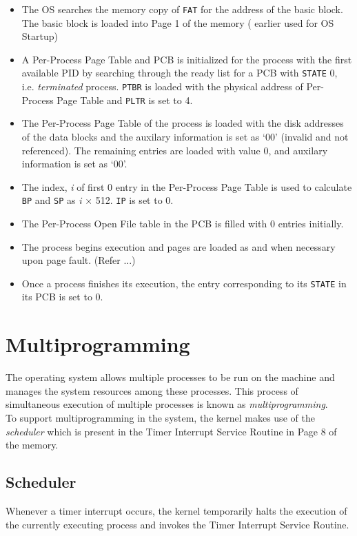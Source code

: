 \documentclass[10pt]{report}
\begin{document}
\begin{itemize}
	\item The OS searches the memory copy of \texttt{FAT} for the address of the basic block. The basic block is loaded into Page 1 of the memory ( earlier used for OS Startup)
	\item A Per-Process Page Table and  PCB is initialized for the process with the first available PID by searching through the ready list for a PCB with \texttt{STATE} 0, i.e. \textit{terminated} process. \texttt{PTBR} is loaded with the physical address of Per-Process Page Table and \texttt{PLTR} is set to 4.
	\item The Per-Process Page Table of the process is loaded with the disk addresses of the data blocks and the auxilary information is set as `00'  (invalid and not referenced). The remaining entries are loaded with value 0, and auxilary information is set as `00'. 
	\item The index, \textit{i} of first 0 entry in the Per-Process Page Table is used to calculate \texttt{BP} and \texttt{SP} as \textit{i} $\times$ 512. \texttt{IP} is set to 0. 
	\item The Per-Process Open File table in the PCB is filled with 0 entries initially.
	\item The process begins execution and pages are loaded as and when necessary upon page fault. (Refer ...)
	\item Once a process finishes its execution, the entry corresponding to its \texttt{STATE} in its PCB is set to 0.

\end{itemize}

\section{Multiprogramming}
	
The operating system allows multiple processes to be run on the machine and manages the system resources among these processes. This process of simultaneous execution of multiple processes is known as \emph{multiprogramming}.  \\

To support multiprogramming in the system, the kernel makes use of the \emph{scheduler} which is present in the Timer Interrupt Service Routine in Page 8 of the memory.

\subsection{Scheduler}
\label{chp:scheduler}
Whenever a timer interrupt occurs, the kernel temporarily halts the execution of the currently executing process and invokes the Timer Interrupt Service Routine.
\end{document}
